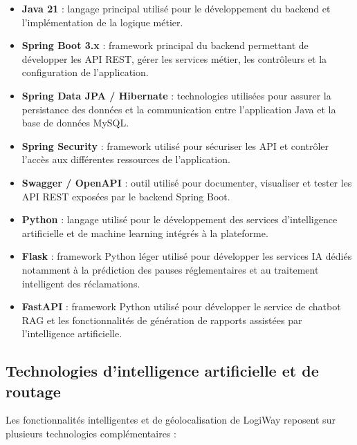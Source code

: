 \documentclass[12pt,a4paper]{report}
\begin{document}
\begin{itemize}
    \item \textbf{Java 21} : langage principal utilisé pour le développement
    du backend et l'implémentation de la logique métier.

    \item \textbf{Spring Boot 3.x} : framework principal du backend permettant
    de développer les API REST, gérer les services métier, les contrôleurs et
    la configuration de l'application.

    \item \textbf{Spring Data JPA / Hibernate} : technologies utilisées pour
    assurer la persistance des données et la communication entre l'application
    Java et la base de données MySQL.

    \item \textbf{Spring Security} : framework utilisé pour sécuriser les API
    et contrôler l'accès aux différentes ressources de l'application.

    \item \textbf{Swagger / OpenAPI} : outil utilisé pour documenter,
    visualiser et tester les API REST exposées par le backend Spring Boot.

    \item \textbf{Python} : langage utilisé pour le développement des services
    d'intelligence artificielle et de machine learning intégrés à la plateforme.

    \item \textbf{Flask} : framework Python léger utilisé pour développer les
    services IA dédiés notamment à la prédiction des pauses réglementaires et
    au traitement intelligent des réclamations.

    \item \textbf{FastAPI} : framework Python utilisé pour développer le
    service de chatbot RAG et les fonctionnalités de génération de rapports
    assistées par l'intelligence artificielle.
\end{itemize}

\subsection{Technologies d'intelligence artificielle et de routage}

Les fonctionnalités intelligentes et de géolocalisation de LogiWay reposent
sur plusieurs technologies complémentaires :
\end{document}
